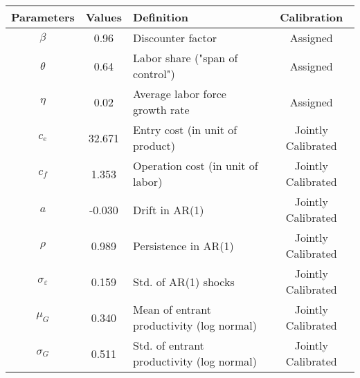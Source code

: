 \begin{tabular}{cclc}
\toprule
Parameters & Values & Definition & Calibration \\
\midrule
$\beta$ & 0.96 & Discounter factor & Assigned \\
$\theta$ & 0.64 & Labor share ("span of control") & Assigned \\
$\eta$ & 0.02 & Average labor force growth rate & Assigned \\
$c_e$ & 32.671 & Entry cost (in unit of product) & Jointly Calibrated \\
$c_f$ & 1.353 & Operation cost (in unit of labor) & Jointly Calibrated \\
$a$ & -0.030 & Drift in AR(1) & Jointly Calibrated \\
$\rho$ & 0.989 & Persistence in AR(1) & Jointly Calibrated \\
$\sigma_{\varepsilon}$ & 0.159 & Std. of AR(1) shocks & Jointly Calibrated \\
$\mu_{G}$ & 0.340 & Mean of entrant productivity (log normal) & Jointly Calibrated \\
$\sigma_{G}$ & 0.511 & Std. of entrant productivity (log normal) & Jointly Calibrated \\
\bottomrule
\end{tabular}
